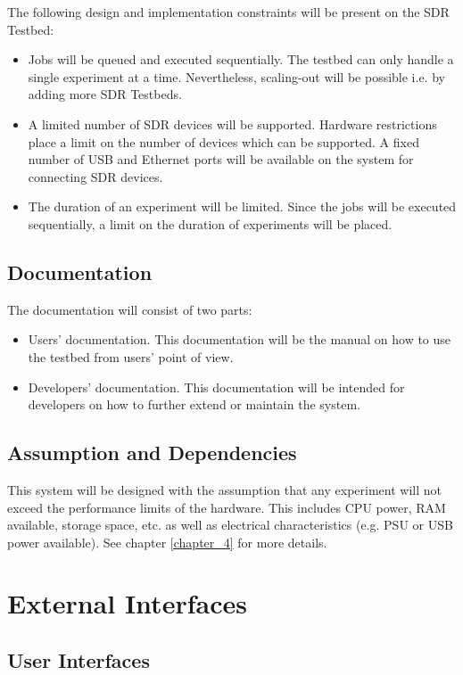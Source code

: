 \documentclass[english,titlepage,a4paper]{report}
\begin{document}
The following design and implementation constraints will be present on the SDR Testbed:
\begin{itemize}
\item Jobs will be queued and executed sequentially.
  The testbed can only handle a single experiment at a time.
  Nevertheless, scaling-out will be possible i.e. by adding more SDR Testbeds.
\item A limited number of SDR devices will be supported.
  Hardware restrictions place a limit on the number of devices which can be supported.
  A fixed number of USB and Ethernet ports will be available on the system for connecting SDR devices.
\item The duration of an experiment will be limited.
  Since the jobs will be executed sequentially, a limit on the duration of experiments will be placed.
\end{itemize}

\section{Documentation}

The documentation will consist of two parts:
\begin{itemize}
\item Users' documentation.
  This documentation will be the manual on how to use the testbed from users' point of view.
\item Developers' documentation.
  This documentation will be intended for developers on how to further extend or maintain the system.
\end{itemize}

\section{Assumption and Dependencies}

This system will be designed with the assumption that any experiment will not exceed the performance limits of the hardware.
This includes CPU power, RAM available, storage space, etc. as well as electrical characteristics (e.g. PSU or USB power available).
See chapter \ref{chapter_4} for more details.


\chapter{External Interfaces}
\section{User Interfaces}
\end{document}
